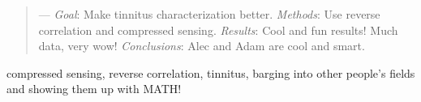 \documentclass[journal]{IEEEtran}
\begin{document}
\begin{abstract}
— \textit{Goal}: Make tinnitus characterization better.
\textit{Methods}: Use reverse correlation and compressed sensing.
\textit{Results}: Cool and fun results! Much data, very wow!
\textit{Conclusions}: Alec and Adam are cool and smart.
\end{abstract}

\begin{IEEEkeywords}
	compressed sensing, reverse correlation, tinnitus, barging into other people's fields
	and showing them up with MATH!
\end{IEEEkeywords}
\end{document}
